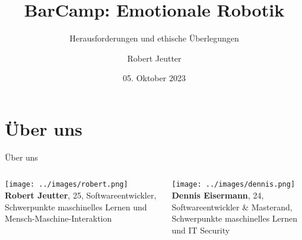 \documentclass[aspectratio=169]{beamer}
\title{BarCamp: Emotionale Robotik}
\subtitle{Herausforderungen und ethische Überlegungen}
\author{Robert Jeutter}
\date{05. Oktober 2023}
\begin{document}
\maketitle

\section{Über uns}
\begin{frame}{Über uns}
  \begin{columns}
    \begin{column}{0.4\textwidth}
      \texttt{[image: ../images/robert.png]}\\
      \textbf{Robert Jeutter}, 25, \arabar{}
      Softwareentwickler,\\
      \scriptsize{Schwerpunkte maschinelles Lernen und Mensch-Maschine-Interaktion}
    \end{column}
    \begin{column}{0.4\textwidth}
      \texttt{[image: ../images/dennis.png]}\\
      \textbf{Dennis Eisermann}, 24, \arabar{}
      Softwareentwickler \& Masterand,\\
      \scriptsize{Schwerpunkte maschinelles Lernen und IT Security}
    \end{column}
  \end{columns}
\end{frame}
\end{document}
